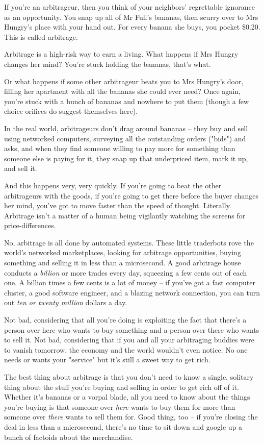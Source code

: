 If you're an arbitrageur, then you think of your neighbors'
regrettable ignorance as an opportunity. You snap up all of Mr
Full's bananas, then scurry over to Mrs Hungry's place with your
hand out. For every banana she buys, you pocket \$0.20. This is
called arbitrage.

Arbitrage is a high-risk way to earn a living. What happens if Mrs
Hungry changes her mind? You're stuck holding the bananas, that's
what.

Or what happens if some other arbitrageur beats you to Mrs Hungry's
door, filling her apartment with all the bananas she could ever
need? Once again, you're stuck with a bunch of bananas and nowhere
to put them (though a few choice orifices do suggest themselves
here).

In the real world, arbitrageurs don't drag around bananas -- they
buy and sell using networked computers, surveying all the
outstanding orders ("bids") and asks, and when they find someone
willing to pay more for something than someone else is paying for
it, they snap up that underpriced item, mark it up, and sell it.

And this happens very, very quickly. If you're going to beat the
other arbitrageurs with the goods, if you're going to get there
before the buyer changes her mind, you've got to move faster than
the speed of thought. Literally. Arbitrage isn't a matter of a
human being vigilantly watching the screens for price-differences.

No, arbitrage is all done by automated systems. These little
traderbots rove the world's networked marketplaces, looking for
arbitrage opportunities, buying something and selling it in less
than a microsecond. A good arbitrage house conducts a
\emph{billion} or more trades every day, squeezing a few cents out
of each one. A billion times a few cents is a lot of money -- if
you've got a fast computer cluster, a good software engineer, and a
blazing network connection, you can turn out
\emph{ten or twenty million} dollars a day.

Not bad, considering that all you're doing is exploiting the fact
that there's a person over here who wants to buy something and a
person over there who wants to sell it. Not bad, considering that
if you and all your arbitraging buddies were to vanish tomorrow,
the economy and the world wouldn't even notice. No one needs or
wants your "service" but it's still a sweet way to get rich.

The best thing about arbitrage is that you don't need to know a
single, solitary thing about the stuff you're buying and selling in
order to get rich off of it. Whether it's bananas or a vorpal
blade, all you need to know about the things you're buying is that
someone over \emph{here} wants to buy them for more than someone
over \emph{there} wants to sell them for. Good thing, too -- if
you're closing the deal in less than a microsecond, there's no time
to sit down and google up a bunch of factoids about the
merchandise.


